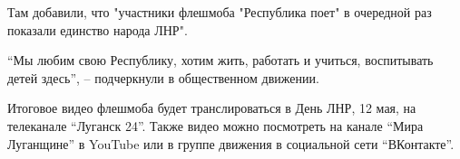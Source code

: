 Там добавили, что "участники флешмоба "Республика поет" в очередной раз показали единство народа ЛНР".

\enquote{Мы любим свою Республику, хотим жить, работать и учиться, воспитывать детей здесь}, – подчеркнули в общественном движении.

Итоговое видео флешмоба будет транслироваться в День ЛНР, 12 мая, на телеканале
\enquote{Луганск 24}. Также видео можно посмотреть на канале \enquote{Мира Луганщине} в YouTube
или в группе движения в социальной сети \enquote{ВКонтакте}.

